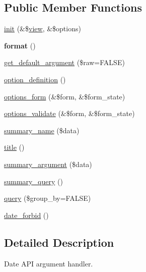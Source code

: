 \subsection*{Public Member Functions}
\begin{DoxyCompactItemize}
\item 
\hyperlink{classdate__views__argument__handler__simple_afa0fa54cf00568c919af125b94c01ede}{init} (\&\$\hyperlink{classview}{view}, \&\$options)
\item 
\hypertarget{classdate__views__argument__handler__simple_a04a805693b80810785675bb2ede286ad}{
{\bfseries format} ()}
\label{classdate__views__argument__handler__simple_a04a805693b80810785675bb2ede286ad}

\item 
\hyperlink{classdate__views__argument__handler__simple_ad4843a30369e2de82db47c204167cbb0}{get\_\-default\_\-argument} (\$raw=FALSE)
\item 
\hyperlink{classdate__views__argument__handler__simple_a346c709c51b14ccaaf186c3651eba925}{option\_\-definition} ()
\item 
\hyperlink{classdate__views__argument__handler__simple_a5e0544a2cc996a45bca1ff1982da9fbc}{options\_\-form} (\&\$form, \&\$form\_\-state)
\item 
\hyperlink{classdate__views__argument__handler__simple_a69e0df0155f42ffff2722fa1bc4b7f7b}{options\_\-validate} (\&\$form, \&\$form\_\-state)
\item 
\hyperlink{classdate__views__argument__handler__simple_a012035138d65e75b0f70af0e2024aa29}{summary\_\-name} (\$data)
\item 
\hyperlink{classdate__views__argument__handler__simple_a127ac9f2d1d7a45088719cfbbfbbdf93}{title} ()
\item 
\hyperlink{classdate__views__argument__handler__simple_abf0949dba7eba44e72cb5f935285716e}{summary\_\-argument} (\$data)
\item 
\hyperlink{classdate__views__argument__handler__simple_abfe22d750f3ce21303be3343499757c1}{summary\_\-query} ()
\item 
\hyperlink{classdate__views__argument__handler__simple_a284da1e34334bd9086194eef7a803d27}{query} (\$group\_\-by=FALSE)
\item 
\hyperlink{classdate__views__argument__handler__simple_a76b7453056c55eb7b0947dbd7fb37526}{date\_\-forbid} ()
\end{DoxyCompactItemize}


\subsection{Detailed Description}
Date API argument handler. 

